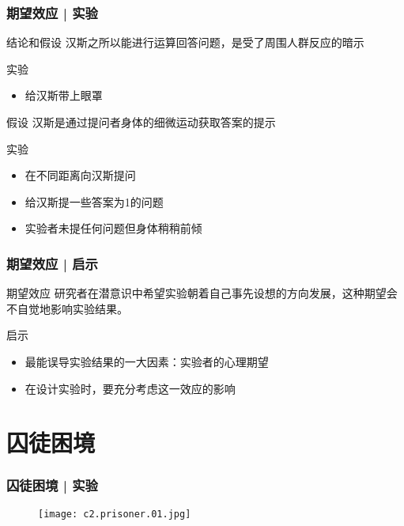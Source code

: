 \begin{frame}
  \frametitle{期望效应 | 实验}
  \begin{block}{结论和假设}
    汉斯之所以能进行运算回答问题，是受了周围人群反应的暗示
  \end{block}
  \pause
  \begin{block}{实验}
    \begin{itemize}
      \item 给汉斯带上眼罩
    \end{itemize}
  \end{block}
  \pause
  \begin{block}{假设}
    汉斯是通过提问者身体的细微运动获取答案的提示
  \end{block}
  \pause
  \begin{block}{实验}
    \begin{itemize}
      \item 在不同距离向汉斯提问
      \item 给汉斯提一些答案为1的问题
      \item 实验者未提任何问题但身体稍稍前倾
    \end{itemize}
  \end{block}
\end{frame}

\begin{frame}
  \frametitle{期望效应 | 启示}
  \begin{block}{期望效应}
    研究者在潜意识中希望实验朝着自己事先设想的方向发展，这种期望会不自觉地影响实验结果。
  \end{block}
  \pause
  \begin{block}{启示}
    \begin{itemize}
      \item 最能误导实验结果的一大因素：实验者的心理期望
      \item 在设计实验时，要充分考虑这一效应的影响
    \end{itemize}
  \end{block}
\end{frame}

\section{囚徒困境}
\begin{frame}
  \frametitle{囚徒困境 | 实验}
  \begin{figure}
    \centering
    \texttt{[image: c2.prisoner.01.jpg]}
  \end{figure}
\end{frame}

